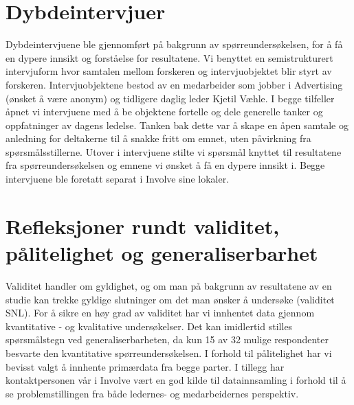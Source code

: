 \section{Dybdeintervjuer}
Dybdeintervjuene ble gjennomført på bakgrunn av spørreundersøkelsen, for å få en dypere innsikt og forståelse for resultatene. Vi benyttet en semistrukturert intervjuform hvor samtalen mellom forskeren og intervjuobjektet blir styrt av forskeren. Intervjuobjektene bestod av en medarbeider som jobber i Advertising (ønsket å være anonym) og tidligere daglig leder Kjetil Væhle. I begge tilfeller åpnet vi intervjuene med å be objektene fortelle og dele generelle tanker og oppfatninger av dagens ledelse. Tanken bak dette var å skape en åpen samtale og anledning for deltakerne til å snakke fritt om emnet, uten påvirkning fra spørsmålsstillerne. Utover i intervjuene stilte vi spørsmål knyttet til resultatene fra spørreundersøkelsen og emnene vi ønsket å få en dypere innsikt i. Begge intervjuene ble foretatt separat i Involve sine lokaler.

\section{Refleksjoner rundt validitet, pålitelighet og generaliserbarhet}
Validitet handler om gyldighet, og om man på bakgrunn av resultatene av en studie kan trekke gyldige slutninger om det man ønsker å undersøke (validitet SNL). For å sikre en høy grad av validitet har vi innhentet data gjennom kvantitative - og kvalitative undersøkelser. Det kan imidlertid stilles spørsmålstegn ved generaliserbarheten, da kun 15 av 32 mulige respondenter besvarte den kvantitative spørreundersøkelsen. I forhold til pålitelighet har vi bevisst valgt å innhente primærdata fra begge parter. I tillegg har kontaktpersonen vår i Involve vært en god kilde til datainnsamling i forhold til å se problemstillingen fra både ledernes- og medarbeidernes perspektiv. 